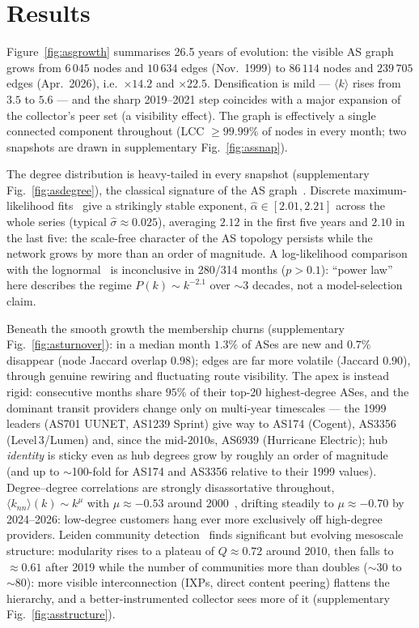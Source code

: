 \section{Results}

Figure~\ref{fig:asgrowth} summarises 26.5 years of evolution: the visible AS
graph grows from $6\,045$ nodes and $10\,634$ edges (Nov.~1999) to $86\,114$
nodes and $239\,705$ edges (Apr.~2026), i.e.\ $\times14.2$ and $\times22.5$.
Densification is mild --- $\langle k\rangle$ rises from $3.5$ to $5.6$ --- and
the sharp 2019--2021 step coincides with a major expansion of the collector's
peer set (a visibility effect). The graph is effectively a single connected
component throughout (LCC $\geq99.99\%$ of nodes in every month; two
snapshots are drawn in supplementary Fig.~\ref{fig:assnap}).

The degree distribution is heavy-tailed in every snapshot (supplementary
Fig.~\ref{fig:asdegree}), the classical signature of the AS
graph~\cite{faloutsos1999power}. Discrete maximum-likelihood
fits~\cite{clauset2009power,alstott2014powerlaw} give a strikingly stable
exponent, $\hat\alpha\in[2.01,2.21]$ across the whole series (typical
$\hat\sigma\approx0.025$), averaging $2.12$ in the first five years and $2.10$
in the last five: the scale-free character of the AS topology persists while
the network grows by more than an order of magnitude. A log-likelihood
comparison with the lognormal~\cite{clauset2009power} is inconclusive in
280/314 months ($p>0.1$): ``power law'' here describes the regime
$P(k)\!\sim\!k^{-2.1}$ over $\sim$3 decades, not a model-selection claim.

Beneath the smooth growth the membership churns (supplementary
Fig.~\ref{fig:asturnover}): in a median month $1.3\%$ of ASes are new and
$0.7\%$ disappear (node Jaccard overlap $0.98$); edges are far more volatile
(Jaccard $0.90$), through genuine rewiring and fluctuating route visibility.
The apex is instead rigid: consecutive months share $95\%$ of their top-20
highest-degree ASes, and the dominant transit providers change only on
multi-year timescales --- the 1999 leaders (AS701 UUNET, AS1239 Sprint) give
way to AS174 (Cogent), AS3356 (Level\,3/Lumen) and, since the mid-2010s,
AS6939 (Hurricane Electric); hub \emph{identity} is sticky even as hub
degrees grow by roughly an order of magnitude (and up to $\sim$100-fold for
AS174 and AS3356 relative to their 1999 values).
Degree--degree correlations are strongly disassortative throughout,
$\langle k_{nn}\rangle(k)\sim k^{\mu}$ with $\mu\approx-0.53$ around
2000~\cite{pastorsatorras2001dynamical}, drifting steadily to
$\mu\approx-0.70$ by 2024--2026: low-degree customers hang ever more
exclusively off high-degree providers. Leiden community
detection~\cite{traag2019leiden} finds significant but evolving mesoscale
structure: modularity rises to a plateau of $Q\approx0.72$ around 2010, then
falls to $\approx0.61$ after 2019 while the number of communities more than
doubles ($\sim$30 to $\sim$80): more visible interconnection (IXPs, direct content
peering) flattens the hierarchy, and a better-instrumented collector sees
more of it (supplementary Fig.~\ref{fig:asstructure}).

